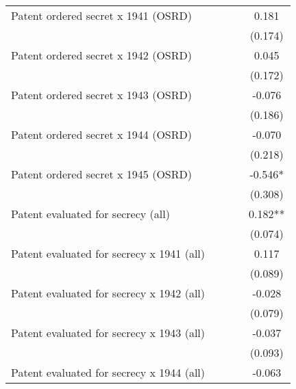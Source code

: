 {\begin{tabular}{l*{4}{c}}
Patent ordered secret x 1941 (OSRD)&               &               &               &       0.181   \\
                        &               &               &               &     (0.174)   \\
Patent ordered secret x 1942 (OSRD)&               &               &               &       0.045   \\
                        &               &               &               &     (0.172)   \\
Patent ordered secret x 1943 (OSRD)&               &               &               &      -0.076   \\
                        &               &               &               &     (0.186)   \\
Patent ordered secret x 1944 (OSRD)&               &               &               &      -0.070   \\
                        &               &               &               &     (0.218)   \\
Patent ordered secret x 1945 (OSRD)&               &               &               &      -0.546*  \\
                        &               &               &               &     (0.308)   \\
Patent evaluated for secrecy (all)&               &               &               &       0.182** \\
                        &               &               &               &     (0.074)   \\
Patent evaluated for secrecy x 1941 (all)&               &               &               &       0.117   \\
                        &               &               &               &     (0.089)   \\
Patent evaluated for secrecy x 1942 (all)&               &               &               &      -0.028   \\
                        &               &               &               &     (0.079)   \\
Patent evaluated for secrecy x 1943 (all)&               &               &               &      -0.037   \\
                        &               &               &               &     (0.093)   \\
Patent evaluated for secrecy x 1944 (all)&               &               &               &      -0.063   \\

\end{tabular}}
